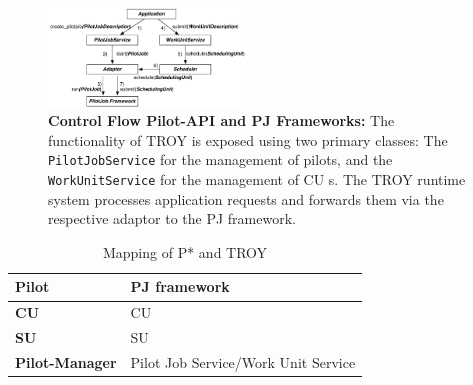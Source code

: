 \documentclass[conference,final]{IEEEtran}
\newcommand{\alnote}[1]{ {\textcolor{blue} { ***andre: #1 }}}
\newcommand{\alnote}[1]{}
\newcommand{\cu}{CU\xspace}
\newcommand{\upp}{\vspace*{-0.5em}}
\begin{document}







\begin{figure}[t]
	\centering
		\includegraphics[width=0.47\textwidth]{figures/troy_flow.pdf}
	\caption{\textbf{Control Flow Pilot-API and PJ Frameworks:} The functionality of TROY is exposed 
	using two primary classes: The \texttt{PilotJobService} for the management 
	of pilots, and the \texttt{WorkUnitService} for the management of \cu s. The 
	TROY runtime system processes application requests and forwards them via the 
	respective adaptor to the PJ framework.
	}
	\label{fig:figures_troy_flow}
\end{figure}

\begin{table}[t]
	\centering
\begin{tabular}{|l|l|}
\hline
\textbf{Pilot} &PJ framework\\
\hline
\textbf{\cu } &\cu \\
\hline
\textbf{SU} &SU\\
\hline
\textbf{Pilot-Manager} & Pilot Job Service/Work Unit Service\\
\hline
\end{tabular}
\caption{Mapping of P* and TROY\upp\upp}\label{table:pstar_elements}
\end{table}
\end{document}
